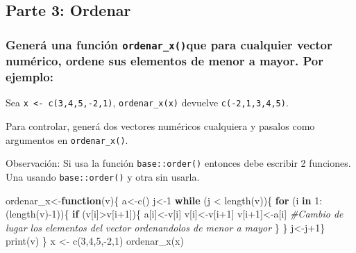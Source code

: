 \documentclass[
]{article}
\newenvironment{Shaded}{\begin{snugshade}}{\end{snugshade}}
\newcommand{\CommentTok}[1]{\textcolor[rgb]{0.56,0.35,0.01}{\textit{#1}}}
\newcommand{\ControlFlowTok}[1]{\textcolor[rgb]{0.13,0.29,0.53}{\textbf{#1}}}
\newcommand{\DecValTok}[1]{\textcolor[rgb]{0.00,0.00,0.81}{#1}}
\newcommand{\FunctionTok}[1]{\textcolor[rgb]{0.00,0.00,0.00}{#1}}
\newcommand{\NormalTok}[1]{#1}
\newcommand{\OtherTok}[1]{\textcolor[rgb]{0.56,0.35,0.01}{#1}}
\newcommand{\SpecialCharTok}[1]{\textcolor[rgb]{0.00,0.00,0.00}{#1}}
\begin{document}
\hypertarget{parte-3-ordenar}{%
\subsection{Parte 3: Ordenar}\label{parte-3-ordenar}}

\hypertarget{generuxe1-una-funciuxf3n-ordenar_xque-para-cualquier-vector-numuxe9rico-ordene-sus-elementos-de-menor-a-mayor.-por-ejemplo}{%
\subsubsection{\texorpdfstring{Generá una función
\texttt{ordenar\_x()}que para cualquier vector numérico, ordene sus
elementos de menor a mayor. Por
ejemplo:}{Generá una función ordenar\_x()que para cualquier vector numérico, ordene sus elementos de menor a mayor. Por ejemplo:}}\label{generuxe1-una-funciuxf3n-ordenar_xque-para-cualquier-vector-numuxe9rico-ordene-sus-elementos-de-menor-a-mayor.-por-ejemplo}}

Sea \texttt{x\ \textless{}-\ c(3,4,5,-2,1)}, \texttt{ordenar\_x(x)}
devuelve \texttt{c(-2,1,3,4,5)}.

Para controlar, generá dos vectores numéricos cualquiera y pasalos como
argumentos en \texttt{ordenar\_x()}.

Observación: Si usa la función \texttt{base::order()} entonces debe
escribir 2 funciones. Una usando \texttt{base::order()} y otra sin
usarla.

\begin{Shaded}
\begin{Highlighting}[]
\NormalTok{ordenar\_x}\OtherTok{\textless{}{-}}\ControlFlowTok{function}\NormalTok{(v)\{}
\NormalTok{  a}\OtherTok{\textless{}{-}}\FunctionTok{c}\NormalTok{()}
\NormalTok{  j}\OtherTok{\textless{}{-}}\DecValTok{1}
\ControlFlowTok{while}\NormalTok{ (j }\SpecialCharTok{\textless{}} \FunctionTok{length}\NormalTok{(v))\{}
\ControlFlowTok{for}\NormalTok{ (i }\ControlFlowTok{in} \DecValTok{1}\SpecialCharTok{:}\NormalTok{(}\FunctionTok{length}\NormalTok{(v)}\SpecialCharTok{{-}}\DecValTok{1}\NormalTok{))\{}
  \ControlFlowTok{if}\NormalTok{ (v[i]}\SpecialCharTok{\textgreater{}}\NormalTok{v[i}\SpecialCharTok{+}\DecValTok{1}\NormalTok{])\{}
\NormalTok{    a[i]}\OtherTok{\textless{}{-}}\NormalTok{v[i]}
\NormalTok{    v[i]}\OtherTok{\textless{}{-}}\NormalTok{v[i}\SpecialCharTok{+}\DecValTok{1}\NormalTok{]}
\NormalTok{    v[i}\SpecialCharTok{+}\DecValTok{1}\NormalTok{]}\OtherTok{\textless{}{-}}\NormalTok{a[i]  }\CommentTok{\#Cambio de lugar los elementos del vector ordenandolos de menor a mayor}
\NormalTok{    \}}
\NormalTok{  \}}
\NormalTok{  j}\OtherTok{\textless{}{-}}\NormalTok{j}\SpecialCharTok{+}\DecValTok{1}\NormalTok{\}  }
  \FunctionTok{print}\NormalTok{(v)}
\NormalTok{\}}
\NormalTok{x }\OtherTok{\textless{}{-}} \FunctionTok{c}\NormalTok{(}\DecValTok{3}\NormalTok{,}\DecValTok{4}\NormalTok{,}\DecValTok{5}\NormalTok{,}\SpecialCharTok{{-}}\DecValTok{2}\NormalTok{,}\DecValTok{1}\NormalTok{)}
\FunctionTok{ordenar\_x}\NormalTok{(x)}
\end{Highlighting}
\end{Shaded}
\end{document}
